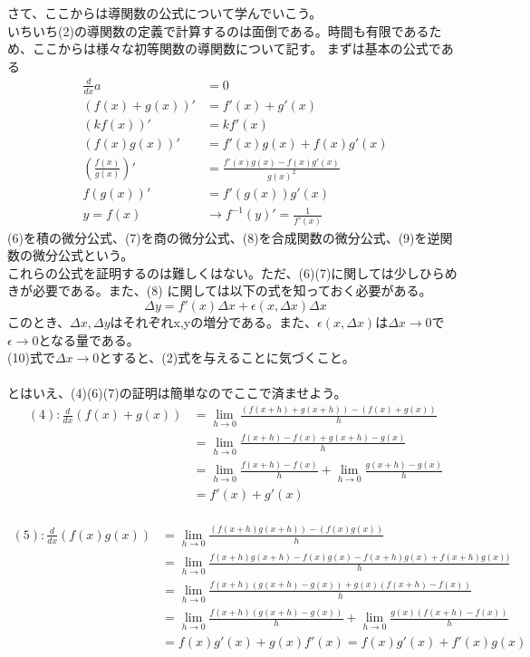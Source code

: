 \documentclass[a4j,dvipdfmx]{jsarticle}
\begin{document}
    さて、ここからは導関数の公式について学んでいこう。\\
    いちいち(2)の導関数の定義で計算するのは面倒である。時間も有限であるため、ここからは様々な初等関数の導関数について記す。
    まずは基本の公式である\\
    \begin{align}
        \frac{d}{dx}a&=0\\
        (f(x)+g(x))'&=f'(x)+g'(x)\\
        (kf(x))'&=kf'(x)\\
        (f(x)g(x))'&=f'(x)g(x)+f(x)g'(x)\\
        (\frac{f(x)}{g(x)})'&=\frac{f'(x)g(x)-f(x)g'(x)}{g(x)^2}\\
        f(g(x))'&=f'(g(x))g'(x)\\
        y=f(x)&\rightarrow f^{-1}(y)'=\frac{1}{f'(x)}
    \end{align}
    (6)を積の微分公式、(7)を商の微分公式、(8)を合成関数の微分公式、(9)を逆関数の微分公式という。\\
    これらの公式を証明するのは難しくはない。ただ、(6)(7)に関しては少しひらめきが必要である。また、(8)
    に関しては以下の式を知っておく必要がある。\\
    \begin{equation}
        \Delta y=f'(x)\Delta x+\epsilon(x,\Delta x)\Delta x
    \end{equation}
    このとき、$\Delta x,\Delta y$はそれぞれx,yの増分である。また、$\epsilon(x,\Delta x)$は$\Delta x\rightarrow0$で
    $\epsilon\rightarrow0$となる量である。\\
    (10)式で$\Delta x\rightarrow0$とすると、(2)式を与えることに気づくこと。\\\\
    とはいえ、(4)(6)(7)の証明は簡単なのでここで済ませよう。
    \begin{align*}
        (4):\frac{d}{dx}(f(x)+g(x))&=\lim_{h\rightarrow0}\frac{(f(x+h)+g(x+h))-(f(x)+g(x))}{h}\\
        &=\lim_{h\rightarrow0}\frac{f(x+h)-f(x)+g(x+h)-g(x)}{h}\\
        &=\lim_{h\rightarrow0}\frac{f(x+h)-f(x)}{h}+\lim_{h\rightarrow0}\frac{g(x+h)-g(x)}{h}\\
        &=f'(x)+g'(x)
    \end{align*}\\
    \begin{align*}
        (5):\frac{d}{dx}(f(x)g(x))&=\lim_{h\rightarrow0}\frac{(f(x+h)g(x+h))-(f(x)g(x))}{h}\\
        &=\lim_{h\rightarrow0}\frac{f(x+h)g(x+h)-f(x)g(x)-f(x+h)g(x)+f(x+h)g(x))}{h}\\
        &=\lim_{h\rightarrow0}\frac{f(x+h)(g(x+h)-g(x))+g(x)(f(x+h)-f(x))}{h}\\
        &=\lim_{h\rightarrow0}\frac{f(x+h)(g(x+h)-g(x))}{h}+\lim_{h\rightarrow0}\frac{g(x)(f(x+h)-f(x))}{h}\\
        &=f(x)g'(x)+g(x)f'(x)
        =f(x)g'(x)+f'(x)g(x)
    \end{align*}\\
\end{document}
